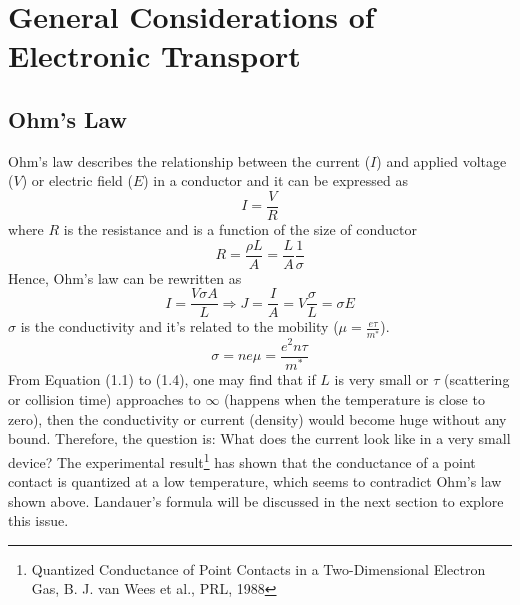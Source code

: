 \chapter{General Considerations of Electronic Transport}

\section{Ohm's Law}
Ohm's law describes the relationship between the current ($I$) and applied voltage ($V$) or electric field ($E$) in a conductor and it can be expressed as \begin{equation} I = \frac{V}{R} 
\end{equation} where $R$ is the resistance and is a function of the size of conductor \begin{equation} R = \frac{\rho L}{A} = \frac{L}{A}\frac{1}{\sigma}
\end{equation} Hence, Ohm's law can be rewritten as \begin{equation}
I = \frac{V \sigma A}{L} \Rightarrow J = \frac{I}{A} = V \frac{\sigma}{L} = \sigma E
\end{equation} $\sigma$ is the conductivity and it's related to the mobility ($\mu = \frac{e \tau}{m^{*}}$). \begin{equation}
\sigma = ne\mu = \frac{e^{2} n \tau}{m^{*}}
\end{equation} From Equation (1.1) to (1.4), one may find that if $L$ is very small or $\tau$ (scattering or collision time) approaches to $\infty$ (happens when the temperature is close to zero), then the conductivity or current (density) would become huge without any bound. Therefore, the question is: What does the current look like in a very small device? The experimental result\footnote{Quantized Conductance of Point Contacts in a Two-Dimensional Electron Gas, B. J. van Wees et al., PRL, 1988} has shown that the conductance of a point contact is quantized at a low temperature, which seems to contradict Ohm's law shown above. Landauer's formula will be discussed in the next section to explore this issue.


